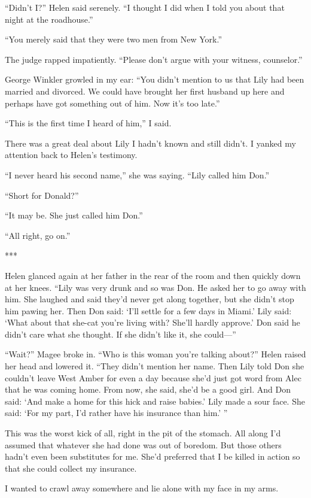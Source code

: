 \documentclass{novel}
\begin{document}
{“Didn’t I?” Helen said serenely. “I thought I did when I told you about that night at the roadhouse.”

“You merely said that they were two men from New York.”

The judge rapped impatiently. “Please don’t argue with your witness, counselor.”

George Winkler growled in my ear: “You didn’t mention to us that Lily had been married and divorced. We could have brought her first husband up here and perhaps have got something out of him. Now it’s too late.”

“This is the first time I heard of him,” I said.

There was a great deal about Lily I hadn’t known and still didn’t. I yanked my attention back to Helen’s testimony.

“I never heard his second name,” she was saying. “Lily called him Don.”

“Short for Donald?”

“It may be. She just called him Don.”

“All right, go on.”

***

Helen glanced again at her father in the rear of the room and then quickly down at her knees. “Lily was very drunk and so was Don. He asked her to go away with him. She laughed and said they’d never get along together, but she didn’t stop him pawing her. Then Don said: ‘I’ll settle for a few days in Miami.’ Lily said: ‘What about that she-cat you’re living with? She’ll hardly approve.’ Don said he didn’t care what she thought. If she didn’t like it, she could—”

“Wait?” Magee broke in. “Who is this woman you’re talking about?” Helen raised her head and lowered it. “They didn’t mention her name. Then Lily told Don she couldn’t leave West Amber for even a day because she’d just got word from Alec that he was coming home. From now, she said, she’d be a good girl. And Don said: ‘And make a home for this hick and raise babies.’ Lily made a sour face. She said: ‘For my part, I’d rather have his insurance than him.’ ”

This was the worst kick of all, right in the pit of the stomach. All along I’d assumed that whatever she had done was out of boredom. But those others hadn’t even been substitutes for me. She’d preferred that I be killed in action so that she could collect my insurance.

I wanted to crawl away somewhere and lie alone with my face in my arms.

}
\end{document}
